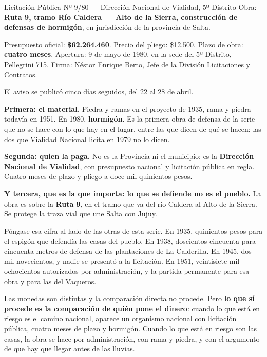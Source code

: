 \begin{ficha}{Licitación Pública Nº 9/80 --- Dirección Nacional de Vialidad, 5º Distrito}
Obra: \textbf{Ruta 9, tramo Río Caldera --- Alto de la Sierra, construcción de defensas de
hormigón}, en jurisdicción de la provincia de Salta.

Presupuesto oficial: \textbf{\$62.264.460}. Precio del pliego: \$12.500. Plazo de obra:
\textbf{cuatro meses}. Apertura: 9 de mayo de 1980, en la sede del 5º Distrito, Pellegrini
715. Firma: Néstor Enrique Berto, Jefe de la División Licitaciones y Contratos.

El aviso se publicó cinco días seguidos, del 22 al 28 de abril.
\end{ficha}

\textbf{Primera: el material.} Piedra y ramas en el proyecto de 1935, rama y piedra todavía en 1951. En 1980,
\textbf{hormigón}. Es la primera obra de defensa de la serie que no se hace con lo que hay en
el lugar, entre las que dicen de qué se hacen: las dos que Vialidad Nacional licita en 1979 no lo dicen.

\textbf{Segunda: quien la paga.} No es la Provincia ni el municipio: es la \textbf{Dirección
Nacional de Vialidad}, con presupuesto nacional y licitación pública en regla. Cuatro meses
de plazo y pliego a doce mil quinientos pesos.

\textbf{Y tercera, que es la que importa: lo que se defiende no es el pueblo.} La obra es
sobre la \textbf{Ruta 9}, en el tramo que va del río Caldera al Alto de la Sierra. Se protege
la traza vial que une Salta con Jujuy.

Póngase esa cifra al lado de las otras de esta serie. En 1935, quinientos pesos para el
espigón que defendía las casas del pueblo. En 1938, doscientos cincuenta para cincuenta
metros de defensa de las plantaciones de La Calderilla. En 1945, dos mil novecientos, y
nadie se presentó a la licitación. En 1951, veintisiete mil ochocientos autorizados por administración, y la
partida permanente para esa obra y para las del Vaqueros.

Las monedas son distintas y la comparación directa no procede. Pero \textbf{lo que sí procede
es la comparación de quién pone el dinero}: cuando lo que está en riesgo es el camino
nacional, aparece un organismo nacional con licitación pública, cuatro meses de plazo y
hormigón. Cuando lo que está en riesgo son las casas, la obra se hace por administración, con
rama y piedra, y con el argumento de que hay que llegar antes de las lluvias.

